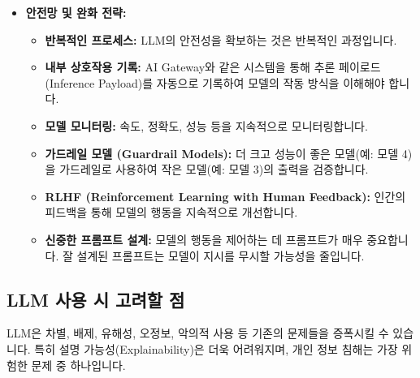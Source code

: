 \documentclass[11pt,a4paper]{article}
\begin{document}
\begin{itemize}
    \item \textbf{안전망 및 완화 전략:}
    \begin{itemize}
        \item \textbf{반복적인 프로세스:} LLM의 안전성을 확보하는 것은 반복적인 과정입니다.
        \item \textbf{내부 상호작용 기록:} AI Gateway와 같은 시스템을 통해 추론 페이로드(Inference Payload)를 자동으로 기록하여 모델의 작동 방식을 이해해야 합니다.
        \item \textbf{모델 모니터링:} 속도, 정확도, 성능 등을 지속적으로 모니터링합니다.
        \item \textbf{가드레일 모델 (Guardrail Models):} 더 크고 성능이 좋은 모델(예: 모델 4)을 가드레일로 사용하여 작은 모델(예: 모델 3)의 출력을 검증합니다.
        \item \textbf{RLHF (Reinforcement Learning with Human Feedback):} 인간의 피드백을 통해 모델의 행동을 지속적으로 개선합니다.
        \item \textbf{신중한 프롬프트 설계:} 모델의 행동을 제어하는 데 프롬프트가 매우 중요합니다. 잘 설계된 프롬프트는 모델이 지시를 무시할 가능성을 줄입니다.
    \end{itemize}
\end{itemize}

\subsection{LLM 사용 시 고려할 점}

LLM은 차별, 배제, 유해성, 오정보, 악의적 사용 등 기존의 문제들을 증폭시킬 수 있습니다. 특히 설명 가능성(Explainability)은 더욱 어려워지며, 개인 정보 침해는 가장 위험한 문제 중 하나입니다.
\end{document}
